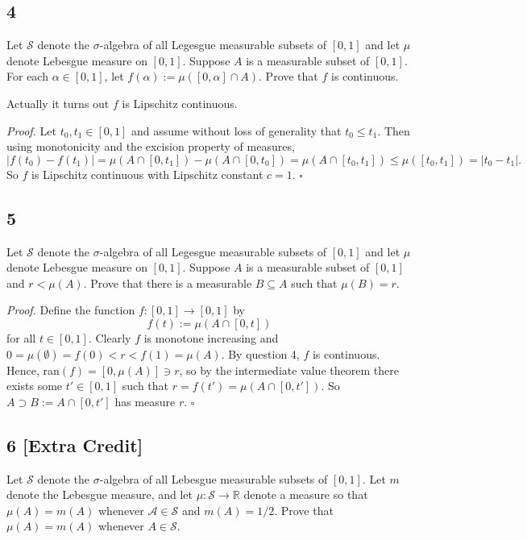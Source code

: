 \documentclass[12pt]{article}
\newcounter{ProofCounter}
\newenvironment{Proof}{\stepcounter{ProofCounter}\textit{Proof.}}{\hfill$\square$}
\begin{document}
\subsection*{4}
\begin{tcolorbox}
Let $\mathcal{S}$ denote the $\sigma$-algebra of all Legesgue measurable subsets of $[0,1]$ and let $\mu$ denote Lebesgue measure on $[0,1]$. Suppose
$A$ is a measurable subset of $[0,1]$. For each $\alpha \in [0,1]$, let $f(\alpha) := \mu([0,\alpha]\cap A)$. Prove that $f$ is continuous.
\end{tcolorbox}

Actually it turns out $f$ is Lipschitz continuous.

\begin{Proof}
Let $t_{0}, t_{1} \in [0,1]$ and assume without loss of generality that $t_{0} \leq t_{1}$. Then using monotonicity and the excision property of
measures,
\[ |f(t_{0}) - f(t_{1})| = \mu(A\cap[0,t_{1}]) - \mu(A\cap[0,t_{0}]) = \mu(A\cap[t_{0},t_{1}]) \leq \mu([t_{0},t_{1}]) = |t_{0} - t_{1}|. \]
So $f$ is Lipschitz continuous with Lipschitz constant $c = 1$.
\end{Proof}






\subsection*{5}
\begin{tcolorbox}
Let $\mathcal{S}$ denote the $\sigma$-algebra of all Legesgue measurable subsets of $[0,1]$ and let $\mu$ denote Lebesgue measure on $[0,1]$. Suppose
$A$ is a measurable subset of $[0,1]$ and $r < \mu(A)$. Prove that there is a measurable $B \subseteq A$ such that $\mu(B) = r$.
\end{tcolorbox}


\begin{Proof}
Define the function $f : [0,1] \rightarrow [0,1]$ by 
\[ f(t) := \mu(A \cap [0,t]) \]
for all $t \in [0,1]$. Clearly $f$ is monotone increasing and $0 = \mu(\emptyset) = f(0) < r < f(1) = \mu(A)$. By question 4, $f$ is
continuous. Hence, ran$(f) = [0, \mu(A)] \ni r$, so by the intermediate value theorem there exists some $t' \in [0,1]$ such that $r = f(t') = \mu(A \cap [0,t'])$. So
$A \supset B := A \cap [0,t']$ has measure $r$.
\end{Proof}

\subsection*{6 [Extra Credit]}
\begin{tcolorbox}
Let $\mathcal{S}$ denote the $\sigma$-algebra of all Lebesgue measurable subsets of $[0,1]$. Let $m$ denote the Lebesgue measure, and let $\mu :
\mathcal{S} \rightarrow \mathbb{R}$ denote a measure so that $\mu(A) = m(A)$ whenever $\mathcal{A} \in \mathcal{S}$ and $m(A) = 1/2$. Prove that
$\mu(A) = m(A)$ whenever $A \in \mathcal{S}$.
\end{tcolorbox}
\end{document}
